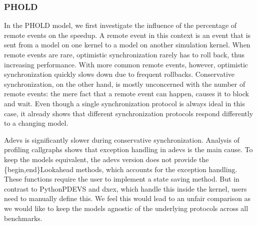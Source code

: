 \subsubsection{PHOLD}
In the PHOLD model, we first investigate the influence of the percentage of remote events on the speedup.
A remote event in this context is an event that is sent from a model on one kernel to a model on another simulation kernel.
When remote events are rare, optimistic synchronization rarely has to roll back, thus increasing performance.
With more common remote events, however, optimistic synchronization quickly slows down due to frequent rollbacks.
Conservative synchronization, on the other hand, is mostly unconcerned with the number of remote events: the mere fact that a remote event can happen, causes it to block and wait.
Even though a single synchronization protocol is always ideal in this case, it already shows that different synchronization protocols respond differently to a changing model.

Adevs is significantly slower during conservative synchronization.
Analysis of profiling callgraphs shows that exception handling in adevs is the main cause. 
To keep the models equivalent, the adevs version does not provide the \{begin,end\}Lookahead methods, which accounts for the exception handling.
These functions require the user to implement a state saving method.
But in contrast to PythonPDEVS and dxex, which handle this inside the kernel, users need to manually define this.
We feel this would lead to an unfair comparison as we would like to keep the models agnostic of the underlying protocols across all benchmarks.


